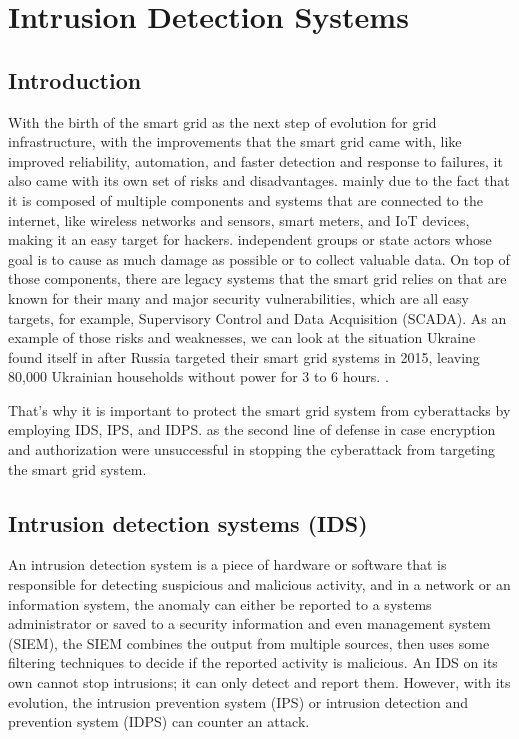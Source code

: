 
\chapter{Intrusion Detection Systems} \label{chap:Intrusion Detection Systems}


\section*{Introduction}
With the birth of the smart grid as the next step of evolution for grid infrastructure, with the improvements that the smart grid came with, like improved reliability, automation, and faster detection and response to failures, it also came with its own set of risks and disadvantages. mainly due to the fact that it is composed of multiple components and systems that are connected to the internet, like wireless networks and sensors, smart meters, and IoT devices, making it an easy target for hackers. independent groups or state actors whose goal is to cause as much damage as possible or to collect valuable data. On top of those components, there are legacy systems that the smart grid relies on that are known for their many and major security vulnerabilities, which are all easy targets, for example, Supervisory Control and Data Acquisition (SCADA). As an example of those risks and weaknesses, we can look at the situation Ukraine found itself in after Russia targeted their smart grid systems in 2015, leaving 80,000 Ukrainian households without power for 3 to 6 hours. \cite{ukrain-sg-attack}.

That's why it is important to protect the smart grid system from cyberattacks by employing IDS, IPS, and IDPS. 
as the second line of defense in case encryption and authorization were unsuccessful in stopping the cyberattack from targeting the smart grid system.

\newpage




\section{Intrusion detection systems (IDS)}
An intrusion detection system is a piece of hardware or software that is responsible for detecting suspicious and malicious activity, and in a network or an information system, the anomaly can either be reported to a systems administrator or saved to a security information and even management system (SIEM), the SIEM combines the output from multiple sources, then uses some filtering techniques to decide if the reported activity is malicious. \cite{ids-def}
An IDS on its own cannot stop intrusions; it can only detect and report them. However, with its evolution, the intrusion prevention system (IPS) or intrusion detection and prevention system (IDPS) can counter an attack. \cite{ibm-ids}








